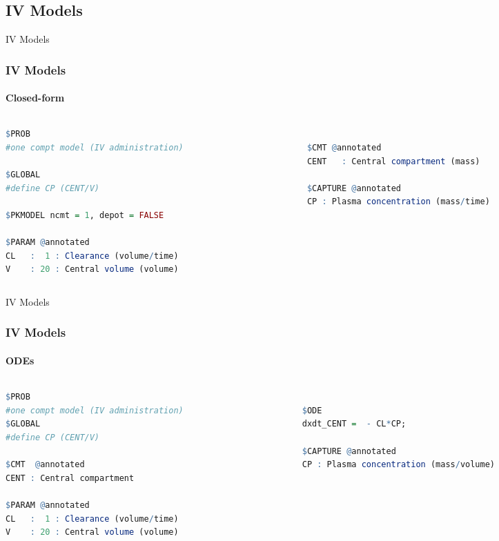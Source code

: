 \documentclass[
	11pt, %
]{beamer}
\begin{document}
\subsection{IV Models}
\begin{frame}[fragile]{IV Models}
	\frametitle{IV Models}
	\framesubtitle{Closed-form} %
    \begin{columns}[c] 
		\begin{column}{0.5\textwidth} %
		\tiny
\begin{lstlisting}[language=R]
$PROB
#one compt model (IV administration)

$GLOBAL
#define CP (CENT/V)

$PKMODEL ncmt = 1, depot = FALSE

$PARAM @annotated
CL   :  1 : Clearance (volume/time)
V    : 20 : Central volume (volume)

\end{lstlisting}
\end{column}
		\begin{column}{0.5\textwidth} %
\begin{lstlisting}[language=R]

$CMT @annotated
CENT   : Central compartment (mass)

$CAPTURE @annotated
CP : Plasma concentration (mass/time)

\end{lstlisting}
		\end{column}
	\end{columns}
	
	
	\end{frame}
	
\begin{frame}[fragile]{IV Models}
	\frametitle{IV Models}
	\framesubtitle{ODEs} %
    \begin{columns}[c] 
		\begin{column}{0.5\textwidth} %
		\tiny
\begin{lstlisting}[language=R]
$PROB
#one compt model (IV administration)
$GLOBAL
#define CP (CENT/V)

$CMT  @annotated
CENT : Central compartment

$PARAM @annotated
CL   :  1 : Clearance (volume/time)
V    : 20 : Central volume (volume)


\end{lstlisting}
\end{column}
		\begin{column}{0.5\textwidth} %
\begin{lstlisting}[language=R]

$ODE
dxdt_CENT =  - CL*CP;

$CAPTURE @annotated
CP : Plasma concentration (mass/volume)
	
	\end{lstlisting}
		\end{column}
	\end{columns}
	
	
	\end{frame}
	
\end{document}
